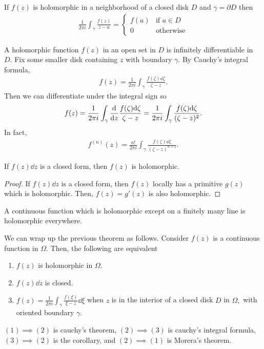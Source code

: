 \documentclass[a4paper,12pt]{article}
\begin{document}
\begin{corollary}
    If $f(z)$ is holomorphic in a neighborhood of a closed disk $D$ and $\gamma=\partial D$ then \begin{align}
        \frac{1}{2\pi i}\int_\gamma\frac{f(z)}{z-a}=\begin{cases}
            f(a)&\text{if }a\in D\\
            0&\text{otherwise}
        \end{cases}
    \end{align}
\end{corollary}
\begin{corollary}
    A holomorphic function $f(z)$ in an open set in $D$ is infinitely differentiable in $D.$ Fix some smaller disk containing $z$ with boundary $\gamma.$ By Cauchy's integral formula, \begin{align}
        f(z)=\frac{1}{2\pi i}\int_\gamma\frac{f(\zeta)\dd\zeta}{\zeta-z}.
    \end{align}
    Then we can differentiate under the integral sign so \begin{align}
        f(z)=\frac{1}{2\pi i}\int_\gamma\derivative{}{z}\frac{f(\zeta)\dd\zeta}{\zeta-z}=\frac{1}{2\pi i}\int_\gamma\frac{f(\zeta)\dd\zeta}{(\zeta-z)^2}.
    \end{align}
    In fact, \begin{align}
        f^{(n)}(z)=\frac{n!}{2\pi i}\int_\gamma\frac{f(\zeta)\dd\zeta}{(\zeta-z)^{n+1}}.
    \end{align}
\end{corollary}
\begin{theorem}[Morera]
    If $f(z)\dd z$ is a closed form, then $f(z)$ is holomorphic.
    \begin{proof}
        If $f(z)\dd z$ is a closed form, then $f(z)$ locally has a primitive $g(z)$ which is holomorphic. Then, $f(z)=g'(z)$ is also holomorphic.
    \end{proof}
\end{theorem}
\begin{corollary}
    A continuous function which is holomorphic except on a finitely many line is holomorphic everywhere.
\end{corollary}
We can wrap up the previous theorem as follows. Consider $f(z)$ is a continuous function in $\Omega.$ Then, the following are equivalent \begin{enumerate}
    \item $f(z)$ is holomorphic in $\Omega.$
    \item $f(z)\dd z$ is closed.
    \item $\displaystyle{f(z)=\frac{1}{2\pi i}\int_\gamma\frac{f(\xi)}{\xi-z}\dd\xi}$ when $z$ is in the interior of a closed disk $D$ in $\Omega,$ with oriented boundary $\gamma.$
\end{enumerate}
$(1)\implies(2)$ is cauchy's theorem, $(2)\implies(3)$ is cauchy's integral formula, $(3)\implies(2)$ is the corollary, and $(2)\implies(1)$ is Morera's theorem.
\end{document}
